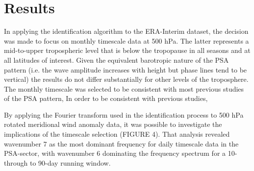 \section{Results}

In applying the identification algorithm to the ERA-Interim dataset, the decision was made to focus on monthly timescale data at 500 hPa. The latter represents a mid-to-upper tropospheric level that is below the tropopause in all seasons and at all latitudes of interest. Given the equivalent barotropic nature of the PSA pattern (i.e. the wave amplitude increases with height but phase lines tend to be vertical) the results do not differ substantially for other levels of the troposphere. The monthly timescale was selected to be consistent with most previous studies of the PSA pattern,  In order to be consistent with previous studies, 


By applying the Fourier transform used in the identification process to 500 hPa rotated meridional wind anomaly data, it was possible to investigate the implications of the timescale selection (FIGURE 4). That analysis revealed wavenumber 7 as the most dominant frequency for daily timescale data in the PSA-sector, with wavenumber 6 dominating the frequency spectrum for a 10- through to 90-day running window. 